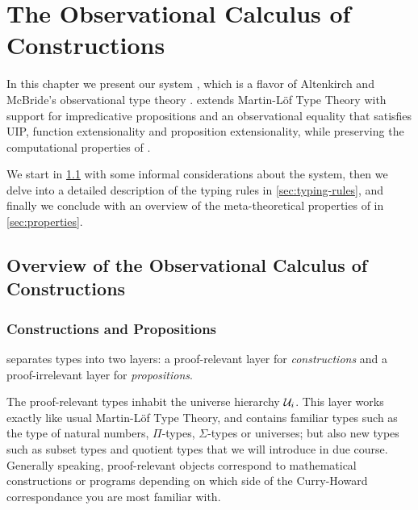 \setchapterpreamble[u]{\margintoc}
\chapter{The Observational Calculus of Constructions}
\label{ch:observational}

In this chapter we present our system \SetoidCC, which is a flavor of 
Altenkirch and McBride's observational type theory \cite{altenkirchAl:plpv2007}.
% 
\SetoidCC extends Martin-Löf Type Theory with support for impredicative 
propositions and an observational equality that satisfies UIP, function 
extensionality and proposition extensionality, while preserving
the computational properties of \MLTT. 

We start in \cref{sec:generalities} with some informal considerations about the system, 
then we delve into a detailed description of the typing rules in 
\cref{sec:typing-rules}, and finally we conclude 
with an overview of the meta-theoretical properties of
\SetoidCC in \cref{sec:properties}.

\section{Overview of the Observational Calculus of Constructions}
\label{sec:generalities}

\subsection{Constructions and Propositions}

\SetoidCC separates types into two layers: a proof-relevant layer for 
\emph{constructions} and a proof-irrelevant layer for \emph{propositions}. 

The proof-relevant types inhabit the universe hierarchy \( \mathcal{U}_i \).
% 
This layer works exactly like usual Martin-Löf Type Theory, and
contains familiar types
such as the type of natural numbers, \( \Pi \)-types, \( \Sigma \)-types or 
universes; but also new types such as subset types and quotient types that
we will introduce in due course.
% 
Generally speaking, proof-relevant objects correspond to mathematical 
constructions or programs depending on which side of the Curry-Howard 
correspondance you are most familiar with.

